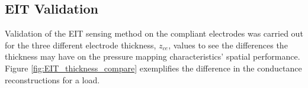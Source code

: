 \subsection{EIT Validation}
\label{subsec:eit_validation}
Validation of the EIT sensing method on the compliant electrodes was carried out for the three different electrode thickness, $z_{ce}$, values to see the differences the thickness may have on the pressure mapping characteristics' spatial performance. Figure \ref{fig:EIT_thickness_compare} exemplifies the difference in the conductance reconstructions for a load.
\begin{figure}[H]
	\centering

\end{figure}
